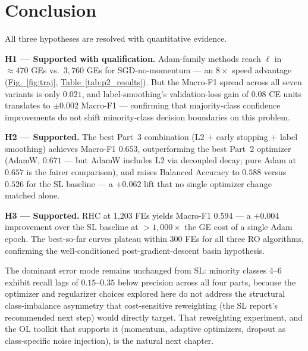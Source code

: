 \documentclass[conference]{IEEEtran}
\newcommand{\figref}[1]{\hyperref[#1]{\textcolor{denim_comp}{Fig.~\ref*{#1}}}}
\newcommand{\tabref}[1]{\hyperref[#1]{\textcolor{sage}{Table~\ref*{#1}}}}
\begin{document}
\section{Conclusion}\label{sec:conclusion}

All three hypotheses are resolved with quantitative evidence.

\textbf{H1 --- Supported with qualification.}
Adam-family methods reach $\ell$ in ${\approx}470$ GEs vs.\ $3{,}760$ GEs
for SGD-no-momentum --- an $8\times$ speed advantage
(\figref{fig:traj}, \tabref{tab:p2_results}).
But the Macro-F1 spread across all seven variants is only $0.021$,
and label-smoothing's validation-loss gain of $0.08$ CE units translates to
$\pm 0.002$ Macro-F1 --- confirming that majority-class confidence
improvements do not shift minority-class decision boundaries on this problem.

\textbf{H2 --- Supported.}
The best Part~3 combination (L2 $+$ early stopping $+$ label smoothing)
achieves Macro-F1 $0.653$, outperforming the best Part~2 optimizer
(AdamW, $0.671$ --- but AdamW includes L2 via decoupled decay;
pure Adam at $0.657$ is the fairer comparison),
and raises Balanced Accuracy to $0.588$ versus $0.526$ for the SL baseline ---
a $+0.062$ lift that no single optimizer change matched alone.

\textbf{H3 --- Supported.}
RHC at 1{,}203 FEs yields Macro-F1 $0.594$ --- a $+0.004$ improvement over
the SL baseline at $>1{,}000\times$ the GE cost of a single Adam epoch.
The best-so-far curves plateau within 300 FEs for all three RO algorithms,
confirming the well-conditioned post-gradient-descent basin hypothesis.

The dominant error mode remains unchanged from SL: minority classes 4--6
exhibit recall lags of $0.15$--$0.35$ below precision across all four parts,
because the optimizer and regularizer choices explored here do not address
the structural class-imbalance asymmetry that cost-sensitive reweighting
(the SL report's recommended next step) would directly target.
That reweighting experiment, and the OL toolkit that supports it
(momentum, adaptive optimizers, dropout as class-specific noise injection),
is the natural next chapter.

\end{document}
